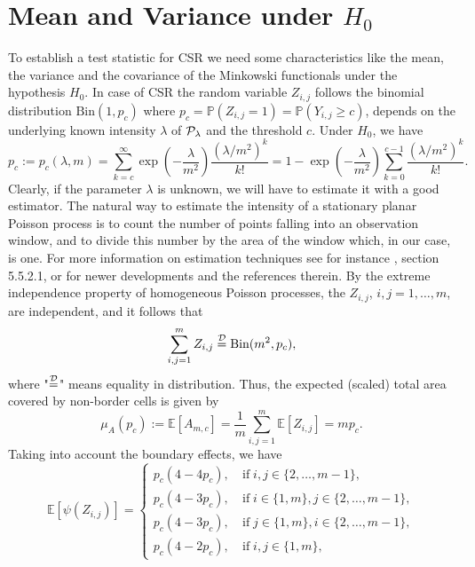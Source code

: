 \documentclass[12pt]{article}
\def\P{\mathbb{P}}
\newcommand{\edist}{\stackrel{\mbox{\scriptsize${\cal D}$}}{=}}
\begin{document}
\section{Mean and Variance under $H_0$}\label{sec:mean.variance}
To establish a test statistic for CSR we need some characteristics like the mean, the variance and the covariance of the Minkowski functionals under the hypothesis $H_0$.
In case of CSR the random variable $Z_{i,j}$ follows the binomial distribution $\mbox{Bin}(1,p_c)$ where $p_c=\P(Z_{i,j}=1)=\P(Y_{i,j}\ge c)$, depends
on the underlying known intensity $\lambda$ of ${\cal P}_\lambda$ and the threshold $c$. Under $H_0$, we have
\begin{equation}\label{pc}
p_c:=p_c(\lambda,m)=\sum_{k=c}^\infty\exp\left(-\frac{\lambda}{m^2}\right)\frac{(\lambda/m^2)^k}{k!}=1-\exp \left(-\frac{\lambda}{m^2}\right)\sum_{k=0}^{c-1}\frac{(\lambda/m^2)^k}{k!}.
\end{equation}
Clearly, if the parameter $\lambda$ is unknown, we will have to estimate it with a good estimator.
The natural way to estimate the intensity of a stationary planar Poisson process is to count the number of points falling into an observation window,
and to divide this number by the area of the window which, in our case, is one. For more information on estimation techniques see for instance \cite{14}, section 5.5.2.1, or for newer developments \cite{11} and the references therein. By the extreme independence property of homogeneous Poisson processes, the $Z_{i,j}$, $i,j=1,\ldots,m$, are independent, and it follows that
\begin{equation*}
\sum_{i,j=1}^mZ_{i,j}\edist \mbox{Bin}(m^2,p_c),
\end{equation*}
where "$\edist$" means equality in distribution.
Thus, the expected (scaled) total area covered by non-border cells is given by
\begin{equation*}
\mu_A(p_c):=\mathbb{E}\left[A_{m,c}\right]=\frac{1}{m}\sum_{i,j=1}^m\mathbb{E}\left[Z_{i,j}\right]=mp_c.
\end{equation*}
Taking into account the boundary effects, we have
\begin{equation*}
\mathbb{E}\left[\psi(Z_{i,j})\right]=\left\{\begin{array}{cl}
p_c(4-4p_c), \ & \mbox{if}\;i,j\in\{2,\ldots,m-1\},\\
p_c(4-3p_c),\ & \mbox{if}\;i\in\{1,m\},j\in\{2,\ldots,m-1\},\\
p_c(4-3p_c),\ & \mbox{if}\;j\in\{1,m\},i\in\{2,\ldots,m-1\},\\
p_c(4-2p_c),\ & \mbox{if}\;i,j\in\{1,m\},\end{array}\right.
\end{equation*}
\end{document}
